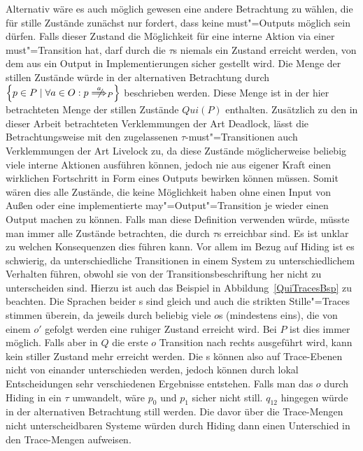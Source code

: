 Alternativ wäre es auch möglich gewesen eine andere Betrachtung zu wählen, die
für stille Zustände zunächst nur fordert, dass keine must"=Outputs möglich sein
dürfen. Falls dieser Zustand die Möglichkeit für eine interne Aktion via einer
must"=Transition hat, darf durch die $\tau$s niemals ein Zustand erreicht
werden, von dem aus ein Output in Implementierungen sicher gestellt wird. Die
Menge der stillen Zustände würde in der alternativen Betrachtung durch
$\left\{p\in P\mid \forall a\in O: p\nweakmust[a]_P \right\}$ beschrieben
werden. Diese Menge ist in der hier betrachteten Menge der stillen Zustände
$Qui (P)$ enthalten. Zusätzlich zu den in dieser Arbeit betrachteten
Verklemmungen der Art Deadlock, lässt die Betrachtungsweise mit den
zugelassenen $\tau$-must"=Transitionen auch Verklemmungen der Art Livelock zu,
da diese Zustände möglicherweise beliebig viele interne Aktionen ausführen
können, jedoch nie aus eigener Kraft einen wirklichen Fortschritt in Form eines
Outputs bewirken können müssen. Somit wären dies alle Zustände, die keine
Möglichkeit haben ohne einen Input von Außen oder eine implementierte
may"=Output"=Transition je wieder einen Output machen zu können. Falls man
diese Definition verwenden würde, müsste man immer alle Zustände betrachten,
die durch $\tau$s erreichbar sind. Es ist unklar zu welchen Konsequenzen dies
führen kann. Vor allem im Bezug auf Hiding ist es schwierig, da
unterschiedliche Transitionen in einem System zu unterschiedlichem Verhalten
führen, obwohl sie von der Transitionsbeschriftung her nicht zu unterscheiden
sind. Hierzu ist auch das Beispiel in Abbildung~\ref{QuiTracesBsp} zu beachten.
Die Sprachen beider \MEIO{}s sind gleich und auch die strikten Stille"=Traces
stimmen überein, da jeweils durch beliebig viele $o$s (mindestens eins), die
von einem $o'$ gefolgt werden eine ruhiger Zustand erreicht wird. Bei $P$ ist
dies immer möglich. Falls aber in $Q$ die erste $o$ Transition nach rechts
ausgeführt wird, kann kein stiller Zustand mehr erreicht werden. Die \MEIO{}s
können also auf Trace-Ebenen nicht von einander unterschieden werden, jedoch
können durch lokal Entscheidungen sehr verschiedenen Ergebnisse entstehen.
Falls man das $o$ durch Hiding in ein $\tau$ umwandelt, wäre $p_0$ und $p_1$
sicher nicht still. $q_{12}$ hingegen würde in der alternativen Betrachtung
still werden. Die davor über die Trace-Mengen nicht unterscheidbaren Systeme
würden durch Hiding dann einen Unterschied in den Trace-Mengen aufweisen.

